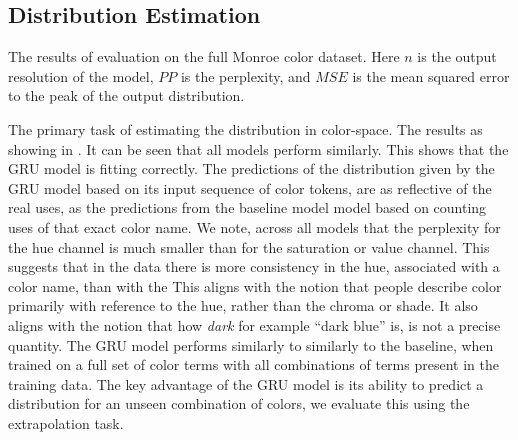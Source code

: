 \documentclass[11pt,letterpaper]{article}
\begin{document}
\subsection{Distribution Estimation}

\begin{table*}
	\centering
	\caption{\label{tblresfull} The results of evaluation on the full Monroe color dataset. Here $n$ is the output resolution of the model, $PP$ is the perplexity, and $MSE$ is the mean squared error to the peak of the output distribution.}
\end{table*}

The primary task of estimating the distribution in color-space.
The results as showing in .
It can be seen that all models perform similarly.
This shows that the GRU model is fitting correctly.
The predictions of the distribution given by the GRU model based on its input sequence of color tokens,
are as reflective of the real uses, as the predictions from the baseline model model based on counting uses of that exact color name.
We note, across all models that the perplexity for the hue channel is much smaller than for the saturation or value channel.
This suggests that in the data there is more consistency in the hue, associated with a color name, than with the 
This aligns with the notion that people describe color primarily with reference to the hue, rather than the chroma or shade.
It also aligns with the notion that how \emph{dark} for example ``dark blue'' is, is not a precise quantity.
The GRU model performs similarly to similarly to the baseline, when trained on a full set of color terms with all combinations of terms present in the training data.
The key advantage of the GRU model is its ability to predict a distribution for an unseen combination of colors, we evaluate this using the extrapolation task.
\end{document}
